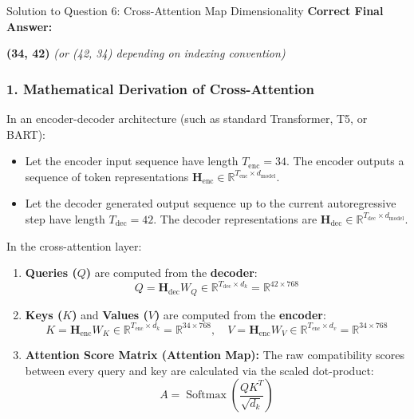 \documentclass[11pt,a4paper]{article}
\begin{document}
\begin{solutionbox}{Solution to Question 6: Cross-Attention Map Dimensionality}
\textbf{Correct Final Answer:}
\begin{center}
\textbf{(34, 42)} \quad \textit{(or (42, 34) depending on indexing convention)}
\end{center}

\subsubsection*{1. Mathematical Derivation of Cross-Attention}
In an encoder-decoder architecture (such as standard Transformer, T5, or BART):
\begin{itemize}[itemsep=2pt]
    \item Let the encoder input sequence have length $T_{\text{enc}} = 34$. The encoder outputs a sequence of token representations $\mathbf{H}_{\text{enc}} \in \mathbb{R}^{T_{\text{enc}} \times d_{\text{model}}}$.
    \item Let the decoder generated output sequence up to the current autoregressive step have length $T_{\text{dec}} = 42$. The decoder representations are $\mathbf{H}_{\text{dec}} \in \mathbb{R}^{T_{\text{dec}} \times d_{\text{model}}}$.
\end{itemize}
In the cross-attention layer:
\begin{enumerate}[label=\textbf{\arabic*.}]
    \item \textbf{Queries ($Q$)} are computed from the \textbf{decoder}:
    \begin{equation*}
        Q = \mathbf{H}_{\text{dec}} W_Q \in \mathbb{R}^{T_{\text{dec}} \times d_k} = \mathbb{R}^{42 \times 768}
    \end{equation*}
    \item \textbf{Keys ($K$)} and \textbf{Values ($V$)} are computed from the \textbf{encoder}:
    \begin{equation*}
        K = \mathbf{H}_{\text{enc}} W_K \in \mathbb{R}^{T_{\text{enc}} \times d_k} = \mathbb{R}^{34 \times 768}, \quad
        V = \mathbf{H}_{\text{enc}} W_V \in \mathbb{R}^{T_{\text{enc}} \times d_v} = \mathbb{R}^{34 \times 768}
    \end{equation*}
    \item \textbf{Attention Score Matrix (Attention Map):}
    The raw compatibility scores between every query and key are calculated via the scaled dot-product:
    \begin{equation}
        A = \operatorname{Softmax}\left(\frac{Q K^T}{\sqrt{d_k}}\right)
    \end{equation}
\end{enumerate}


\end{solutionbox}
\end{document}
